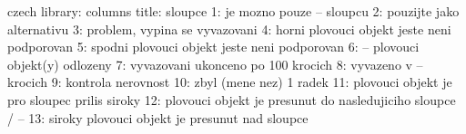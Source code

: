 \startmessages  czech  library: columns
  title: sloupce
      1: je mozno pouze -- sloupcu
      2: pouzijte \string\filbreak\space jako alternativu
      3: problem, vypina se vyvazovani
      4: horni plovouci objekt jeste neni podporovan
      5: spodni plovouci objekt jeste neni podporovan
      6: -- plovouci objekt(y) odlozeny
      7: vyvazovani ukonceno po 100 krocich
      8: vyvazeno v -- krocich
      9: kontrola nerovnost
     10: zbyl (mene nez) 1 radek
     11: plovouci objekt je pro sloupec prilis siroky
     12: plovouci objekt je presunut do nasledujiciho sloupce / -- 
     13: siroky plovouci objekt je presunut nad sloupce
\stopmessages

